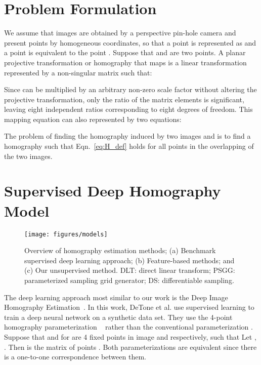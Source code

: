 \documentclass[letterpaper, 10 pt, conference]{ieeeconf}
\begin{document}
 \section{Problem Formulation}
We assume that images are obtained by a perspective pin-hole camera and present 
points by homogeneous coordinates, so that a point  is represented as  and a point  is equivalent to the point . Suppose that  and   are two points. A planar projective transformation or homography that maps  is a linear transformation represented by a non-singular  matrix  such that: 

Since  can be multiplied by an arbitrary non-zero scale factor without altering the projective transformation, only the ratio of the matrix elements is significant, leaving  eight independent ratios corresponding to eight degrees of freedom. This mapping equation can also represented by two equations: 


The problem of finding the homography  induced by two images  and  is to find a homography  such that Eqn.~\eqref{eq:H_def} holds for all points in the overlapping of the two images. 
 



 




 \section{Supervised Deep Homography Model}
\begin{figure*}[t]
\centering
\vspace{2mm}
\texttt{[image: figures/models]}
\caption{Overview of homography estimation methods; (a) Benchmark supervised deep learning approach; (b) Feature-based methods; and (c) Our unsupervised method. DLT: direct linear transform; 
PSGG: parameterized sampling grid generator; DS: differentiable sampling. 
\label{fig:methods}
}
\vspace{-2mm}
\end{figure*}

The deep learning approach most similar to our work is the Deep Image Homography Estimation~\cite{detone2016}. In this work, DeTone et al. use supervised learning to train a deep neural network on a synthetic data set. They use the 4-point homography parameterization ~\cite{baker2006parameterizing} rather than the conventional  parameterization . Suppose that  and  for  are 4 fixed points in image   and  respectively, such that  Let , . Then  is the  matrix of points . Both parameterizations are equivalent since there is a one-to-one correspondence between them. 
\end{document}

